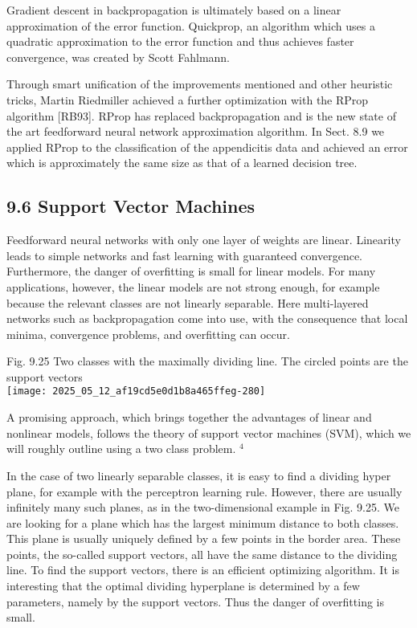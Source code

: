 \documentclass[10pt]{article}
\begin{document}
Gradient descent in backpropagation is ultimately based on a linear approximation of the error function. Quickprop, an algorithm which uses a quadratic approximation to the error function and thus achieves faster convergence, was created by Scott Fahlmann.

Through smart unification of the improvements mentioned and other heuristic tricks, Martin Riedmiller achieved a further optimization with the RProp algorithm [RB93]. RProp has replaced backpropagation and is the new state of the art feedforward neural network approximation algorithm. In Sect. 8.9 we applied RProp to the classification of the appendicitis data and achieved an error which is approximately the same size as that of a learned decision tree.

\subsection*{9.6 Support Vector Machines}
Feedforward neural networks with only one layer of weights are linear. Linearity leads to simple networks and fast learning with guaranteed convergence. Furthermore, the danger of overfitting is small for linear models. For many applications, however, the linear models are not strong enough, for example because the relevant classes are not linearly separable. Here multi-layered networks such as backpropagation come into use, with the consequence that local minima, convergence problems, and overfitting can occur.

Fig. 9.25 Two classes with the maximally dividing line. The circled points are the support vectors\\
\texttt{[image: 2025\_05\_12\_af19cd5e0d1b8a465ffeg-280]}

A promising approach, which brings together the advantages of linear and nonlinear models, follows the theory of support vector machines (SVM), which we will roughly outline using a two class problem. ${ }^{4}$

In the case of two linearly separable classes, it is easy to find a dividing hyper plane, for example with the perceptron learning rule. However, there are usually infinitely many such planes, as in the two-dimensional example in Fig. 9.25. We are looking for a plane which has the largest minimum distance to both classes. This plane is usually uniquely defined by a few points in the border area. These points, the so-called support vectors, all have the same distance to the dividing line. To find the support vectors, there is an efficient optimizing algorithm. It is interesting that the optimal dividing hyperplane is determined by a few parameters, namely by the support vectors. Thus the danger of overfitting is small.
\end{document}
